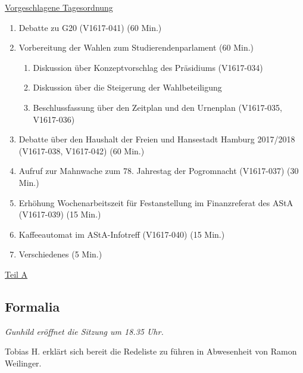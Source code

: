 \documentclass[ngerman,headheight=70pt]{scrartcl}
\begin{document}
    \newpage
    \underline{Vorgeschlagene Tagesordnung}
    \begin{enumerate}[label={\textbf{Top \theenumi}},leftmargin=*]
        \item Debatte zu G20 (V1617-041) (60 Min.)
        \item Vorbereitung der Wahlen zum Studierendenparlament (60 Min.)
        \begin{enumerate}
            \item Diskussion über Konzeptvorschlag des Präsidiums (V1617-034)
            \item Diskussion über die Steigerung der Wahlbeteiligung
            \item Beschlussfassung über den Zeitplan und den Urnenplan
            (V1617-035, V1617-036)
        \end{enumerate}
        \item Debatte über den Haushalt der Freien und Hansestadt Hamburg
              2017/2018 (V1617-038, V1617-042) (60 Min.)
        \item Aufruf zur Mahnwache zum 78. Jahrestag der Pogromnacht (V1617-037) (30 Min.)
        \item Erhöhung Wochenarbeitszeit für Festanstellung im Finanzreferat des AStA (V1617-039) (15 Min.)
        \item Kaffeeautomat im AStA-Infotreff (V1617-040) (15 Min.)
        \item Verschiedenes (5 Min.)
    \end{enumerate}

    \newpage


    {\Large \underline{Teil A}}

    \subsection{Formalia}

    \textit{Gunhild eröffnet die Sitzung um 18.35 Uhr.}

    Tobias H. erklärt sich bereit die Redeliste zu führen in Abwesenheit
    von Ramon Weilinger.
\end{document}
